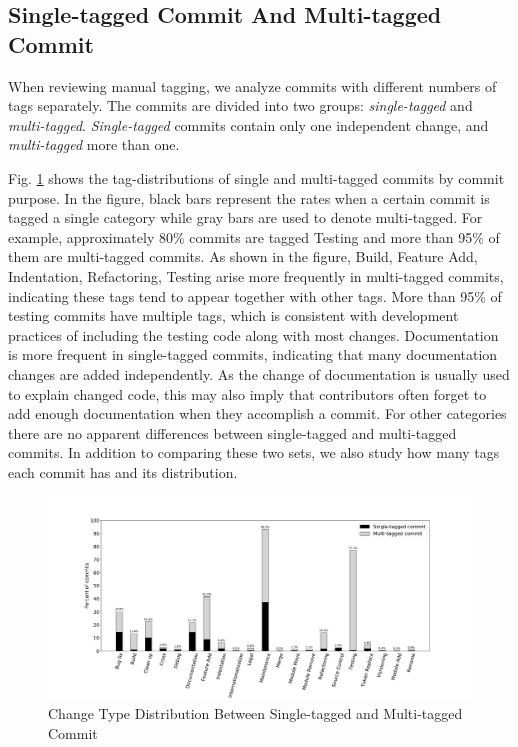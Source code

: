 \subsection{Single-tagged Commit And Multi-tagged Commit}
When reviewing manual tagging, we analyze commits with different numbers of tags separately. 
The commits are divided into two groups: \textit{single-tagged} and \textit{multi-tagged}. \textit{Single-tagged} commits contain only one independent change, and \textit{multi-tagged} more than one. 

Fig. \ref{fig: cat_distribution} shows the tag-distributions of single and multi-tagged commits by commit purpose.
In the figure, black bars represent the rates when a certain commit is tagged a single category while gray bars are used to denote multi-tagged. For example, approximately 80\% commits are tagged Testing and more than 95\% of them are multi-tagged commits.
As shown in the figure, Build, Feature Add, Indentation, Refactoring, Testing arise more frequently in multi-tagged commits, indicating these tags tend to appear together with other tags. 
More than 95\% of testing commits have multiple tags, which is consistent with development practices of including the testing code along with most changes.
Documentation is more frequent in single-tagged commits, indicating that many documentation changes are added independently.
As the change of documentation is usually used to explain changed code, this may also imply that contributors often forget to add enough documentation when they accomplish a commit.
For other categories there are no apparent differences between single-tagged and multi-tagged commits.
In addition to comparing these two sets, we also study how many tags each commit has and its distribution. 
\begin{figure}[htbp]
\centerline{\includegraphics[scale=0.30]{figures/cat_distribution_over_s&m_commits.pdf}}
\caption{Change Type Distribution Between Single-tagged and Multi-tagged Commit}
\label{fig: cat_distribution}
\end{figure}
